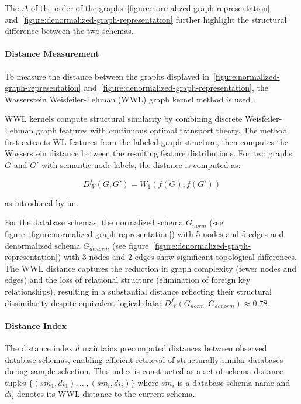 The $\Delta$ of the order of the graphs~\ref{figure:normalized-graph-representation}
and~\ref{figure:denormalized-graph-representation}
further highlight the structural difference between the two schemas.

\paragraph{Distance Measurement}

To measure the distance between the graphs displayed
in~\ref{figure:normalized-graph-representation}
and~\ref{figure:denormalized-graph-representation}, the Wasserstein
Weisfeiler-Lehman (WWL) graph kernel method is used \citep{WWL}.

WWL kernels compute structural similarity by combining discrete Weisfeiler-Lehman
graph features with continuous optimal transport theory. The method first extracts
WL features from the labeled graph structure, then computes the Wasserstein distance
between the resulting feature distributions. For two graphs $G$ and
$G'$ with semantic node labels, the distance is computed as:

\begin{equation}
D^{f}_{W}(G, G') = W_1(f(G), f(G'))
\end{equation}

as introduced by \citeauthor{WWL} in \citeyear{WWL}.

For the database schemas, the normalized
schema $G_{norm}$ (see figure~\ref{figure:normalized-graph-representation})
with 5 nodes and 5 edges and denormalized schema $G_{denorm}$ (see figure~\ref{figure:denormalized-graph-representation})
with 3 nodes and 2 edges show significant topological differences.
The WWL distance captures the reduction in graph complexity (fewer nodes and edges)
and the loss of relational structure (elimination of foreign key relationships),
resulting in a substantial distance reflecting their structural dissimilarity
despite equivalent logical data: $D^{f}_{W}(G_{norm}, G_{denorm}) \approx 0.78$.


\paragraph{Distance Index}

The distance index $d$ maintains precomputed distances between
observed database schemas, enabling efficient retrieval of structurally similar
databases during sample selection. This index is constructed as a set of
schema-distance tuples $\{(sm_1, di_1), \ldots, (sm_i, di_i)\}$ where $sm_i$ is
a database schema name and $di_i$ denotes its WWL distance to the current schema.

